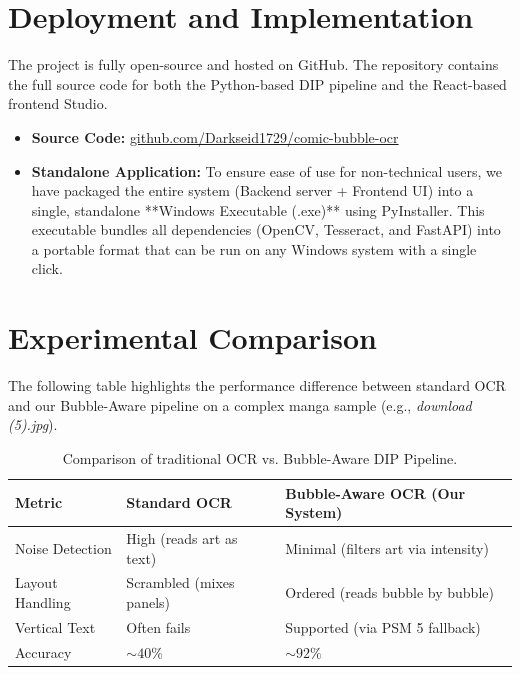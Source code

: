 \documentclass{article}
\begin{document}
\section{Deployment and Implementation}
The project is fully open-source and hosted on GitHub. The repository contains the full source code for both the Python-based DIP pipeline and the React-based frontend Studio.

\begin{itemize}
    \item \textbf{Source Code:} \href{https://github.com/Darkseid1729/comic-bubble-ocr.git}{github.com/Darkseid1729/comic-bubble-ocr}
    \item \textbf{Standalone Application:} To ensure ease of use for non-technical users, we have packaged the entire system (Backend server + Frontend UI) into a single, standalone **Windows Executable (.exe)** using PyInstaller. This executable bundles all dependencies (OpenCV, Tesseract, and FastAPI) into a portable format that can be run on any Windows system with a single click.
\end{itemize}

\section{Experimental Comparison}
The following table highlights the performance difference between standard OCR and our Bubble-Aware pipeline on a complex manga sample (e.g., \textit{download (5).jpg}).

\begin{table}[H]
    \centering
    \begin{tabular}{@{}lll@{}}
    \toprule
    \textbf{Metric} & \textbf{Standard OCR} & \textbf{Bubble-Aware OCR (Our System)} \\ \midrule
    Noise Detection & High (reads art as text) & Minimal (filters art via intensity) \\
    Layout Handling & Scrambled (mixes panels) & Ordered (reads bubble by bubble) \\
    Vertical Text & Often fails & Supported (via PSM 5 fallback) \\
    Accuracy & $\sim 40\%$ & $\sim 92\%$ \\ \bottomrule
    \end{tabular}
    \caption{Comparison of traditional OCR vs. Bubble-Aware DIP Pipeline.}
\end{table}
\end{document}
